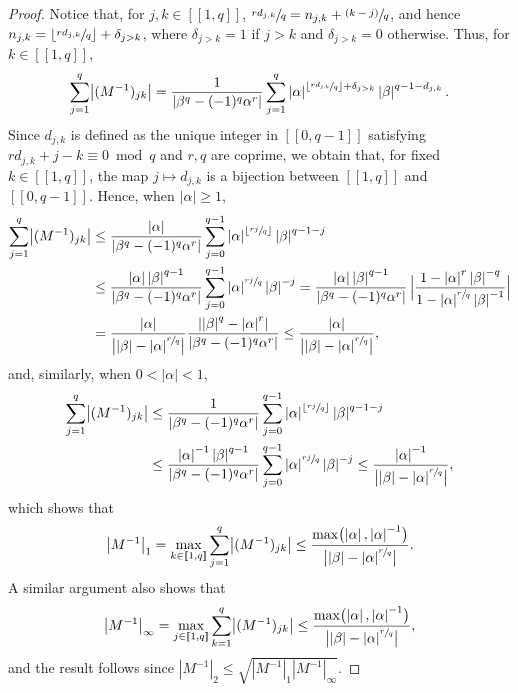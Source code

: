 \documentclass[10pt]{amsart}
\newcommand{\psfrac}[2]{\sfrac{(#1)}{#2}}
\newcommand{\llbracket}{[\![}
\newcommand{\rrbracket}{]\!]}
\theoremstyle{plain}
\theoremstyle{definition}
\newcommand{\abs}[1]{\left\lvert #1\right \rvert}
\newcommand{\floor}[1]{\left\lfloor #1 \right\rfloor}
\newcommand{\babs}[1]{\bigl\lvert #1\bigr \rvert}
\newcommand{\Babs}[1]{\Bigl\lvert #1\Bigr \rvert}
\begin{document}
\begin{proof}
Notice that, for $j, k \in \llbracket 1, q\rrbracket$, $\sfrac{r d_{j, k}}{q} = n_{j, k} + \psfrac{k-j}{q}$, and hence $n_{j, k} = \floor{\sfrac{r d_{j, k}}{q}} + \delta_{j > k}$, where $\delta_{j > k} = 1$ if $j > k$ and $\delta_{j > k} = 0$ otherwise. Thus, for $k \in \llbracket 1, q\rrbracket$,\vspace*{-3pt}
\[
\sum_{j=1}^q \babs{(M^{-1})_{jk}} = \frac{1}{\abs{\beta^q - (-1)^q \alpha^r}} \sum_{j=1}^q \abs{\alpha}^{\floor{\sfrac{r d_{j, k}}{q}} + \delta_{j > k}} \abs{\beta}^{q-1-d_{j, k}}.
\]
Since $d_{j, k}$ is defined as the unique integer in $\llbracket 0, q-1\rrbracket$ satisfying $r d_{j, k} + j - k \equiv 0 \bmod q$ and $r, q$ are coprime, we obtain that, for fixed $k \in \llbracket 1, q\rrbracket$, the map $j \mapsto d_{j, k}$ is a bijection between $\llbracket 1, q\rrbracket$ and $\llbracket 0, q-1\rrbracket$. Hence, when $\abs{\alpha} \geq 1$,\vspace*{-3pt}
\begin{align*}
\sum_{j=1}^q \babs{(M^{-1})_{jk}} & \leq \frac{\abs{\alpha}}{\abs{\beta^q - (-1)^q \alpha^r}} \sum_{j=0}^{q-1} \abs{\alpha}^{\floor{\sfrac{r j}{q}}} \abs{\beta}^{q-1-j}\\
&\leq \frac{\abs{\alpha} \abs{\beta}^{q-1}}{\abs{\beta^q - (-1)^q \alpha^r}} \sum_{j=0}^{q-1} \abs{\alpha}^{\sfrac{r j}{q}} \abs{\beta}^{-j} = \frac{\abs{\alpha} \abs{\beta}^{q-1}}{\abs{\beta^q - (-1)^q \alpha^r}}\, \Babs{\frac{1 - \abs{\alpha}^r \abs{\beta}^{-q}}{1 - \abs{\alpha}^{\sfrac{r}{q}} \abs{\beta}^{-1}}}\\
&= \frac{\abs{\alpha}}{\babs{\abs{\beta} - \abs{\alpha}^{\sfrac{r}{q}}}} \frac{\abs{\abs{\beta}^q - \abs{\alpha}^r}}{\abs{\beta^q - (-1)^q \alpha^r}} \leq \frac{\abs{\alpha}}{\babs{\abs{\beta} - \abs{\alpha}^{\sfrac{r}{q}}}},
\end{align*}
and, similarly, when $0 < \abs{\alpha} < 1$,
\begin{align*}
\sum_{j=1}^q \babs{(M^{-1})_{jk}} & \leq \frac{1}{\abs{\beta^q - (-1)^q \alpha^r}} \sum_{j=0}^{q-1} \abs{\alpha}^{\floor{\sfrac{r j}{q}}} \abs{\beta}^{q-1-j}\\
&\leq \frac{\abs{\alpha}^{-1} \abs{\beta}^{q-1}}{\abs{\beta^q - (-1)^q \alpha^r}} \sum_{j=0}^{q-1} \abs{\alpha}^{\sfrac{r j}{q}} \abs{\beta}^{-j}  \leq \frac{\abs{\alpha}^{-1}}{\babs{\abs{\beta} - \abs{\alpha}^{\sfrac{r}{q}}}},
\end{align*}
which shows that
\[
\babs{M^{-1}}_{1} = \max_{k \in \llbracket 1, q\rrbracket} \sum_{j=1}^q \babs{(M^{-1})_{jk}} \leq \frac{\max\bigl(\abs{\alpha}, \abs{\alpha}^{-1}\bigr)}{\babs{\abs{\beta} - \abs{\alpha}^{\sfrac{r}{q}}}}.
\]
A similar argument also shows that
\[
\babs{M^{-1}}_{\infty} = \max_{j \in \llbracket 1, q\rrbracket} \sum_{k=1}^q \babs{(M^{-1})_{jk}} \leq \frac{\max\bigl(\abs{\alpha}, \abs{\alpha}^{-1}\bigr)}{\babs{\abs{\beta} - \abs{\alpha}^{\sfrac{r}{q}}}},
\]
and the result follows since $\abs{M^{-1}}_{2} \leq \sqrt{\abs{M^{-1}}_{1} \abs{M^{-1}}_{\infty}}$.
\end{proof}
\end{document}
